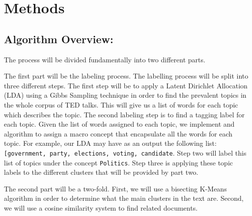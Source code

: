 \documentclass[letterpaper, 11pt]{article}
\begin{document}
\justify


    \section{Methods}\label{methods}

\subsection{Algorithm Overview:}\label{algorithm-overview}

The process will be divided fundamentally into two different parts.

The first part will be the labeling process. The labelling process will
be split into three different steps. The first step will be to apply a
Latent Dirichlet Allocation (LDA) using a Gibbs Sampling technique in
order to find the prevalent topics in the whole corpus of TED talks.
This will give us a list of words for each topic which describes the
topic. The second labeling step is to find a tagging label for each
topic. Given the list of words assigned to each topic, we implement and
algorithm to assign a macro concept that encapsulate all the words for
each topic. For example, our LDA may have as an output the following
list:
\texttt{{[}\textquotesingle{}government\textquotesingle{},\ \textquotesingle{}party\textquotesingle{},\ \textquotesingle{}elections\textquotesingle{},\ \textquotesingle{}voting\textquotesingle{},\ \textquotesingle{}candidate\textquotesingle{}{]}}.
Step two will label this list of topics under the concept
\texttt{Politics}. Step three is applying these topic labels to the
different clusters that will be provided by part two.

The second part will be a two-fold. First, we will use a bisecting
K-Means algorithm in order to determine what the main clusters in the
text are. Second, we will use a cosine similarity system to find related
documents.
\end{document}
